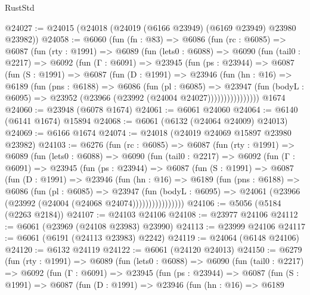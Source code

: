 \begin{lexlean}{RustStd}
\begin{coremodule}
@24027 := @24015 (@24018 (@24019 (@6166 @23949) (@6169 @23949) @23980 @23982))
@24058 := @6060
    (fun (fn : @83) =>
    @6086
      (fun (rc : @6085) =>
      @6087
        (fun (rty : @1991) =>
        @6089
          (fun (lets0 : @6088) =>
          @6090
            (fun (tail0 : @2217) =>
            @6092
              (fun (Γ : @6091) =>
              @23945
                (fun (ps : @23944) =>
                @6087
                  (fun (S : @1991) =>
                  @6087
                    (fun (D : @1991) =>
                    @23946
                      (fun (hn : @16) =>
                      @6189
                        (fun (pns : @6188) =>
                        @6086
                          (fun (pl : @6085) =>
                          @23947
                            (fun (bodyL : @6095) =>
                            @23952 (@23966 (@23992 (@24004 @24027))))))))))))))))
    @1674
@24060 := @23948 (@6078 @1674)
@24061 := @6061 @24060
@24064 := @6140 (@6141 @1674) @15894
@24068 := @6061 (@6132 (@24064 @24009) @24013)
@24069 := @6166 @1674
@24074 := @24018 (@24019 @24069 @15897 @23980 @23982)
@24103 := @6276
    (fun (rc : @6085) =>
    @6087
      (fun (rty : @1991) =>
      @6089
        (fun (lets0 : @6088) =>
        @6090
          (fun (tail0 : @2217) =>
          @6092
            (fun (Γ : @6091) =>
            @23945
              (fun (ps : @23944) =>
              @6087
                (fun (S : @1991) =>
                @6087
                  (fun (D : @1991) =>
                  @23946
                    (fun (hn : @16) =>
                    @6189
                      (fun (pns : @6188) =>
                      @6086
                        (fun (pl : @6085) =>
                        @23947
                          (fun (bodyL : @6095) =>
                          @24061 (@23966 (@23992 (@24004 (@24068 @24074))))))))))))))))
@24106 := @5056 (@5184 (@2263 @2184))
@24107 := @24103 @24106
@24108 := @23977 @24106
@24112 := @6061 (@23969 (@24108 @23983) @23990)
@24113 := @23999 @24106
@24117 := @6061 (@6191 (@24113 @23983) @2242)
@24119 := @24064 (@6148 @24106)
@24120 := @6132 @24119
@24122 := @6061 (@24120 @24013)
@24150 := @6279
    (fun (rty : @1991) =>
    @6089
      (fun (lets0 : @6088) =>
      @6090
        (fun (tail0 : @2217) =>
        @6092
          (fun (Γ : @6091) =>
          @23945
            (fun (ps : @23944) =>
            @6087
              (fun (S : @1991) =>
              @6087
                (fun (D : @1991) =>
                @23946
                  (fun (hn : @16) =>
                  @6189

\end{coremodule}
\end{lexlean}

